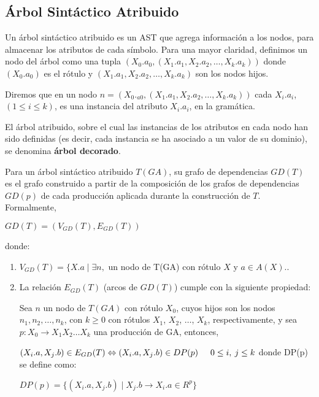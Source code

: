 \subsection{Árbol Sintáctico Atribuido}

Un árbol sintáctico atribuido es un AST que agrega información a los nodos, para almacenar los atributos de cada símbolo.
Para una mayor claridad, definimos un nodo del árbol como una tupla $(X_{0}.a_{0}, (X_{1}.a_{1}, X_{2}.a_{2}, \ldots , X_{k}.a_{k}))$ donde $(X_{0}.a_{0})$ es el rótulo y $(X_{1}.a_{1}, X_{2}.a_{2}, \ldots , X_{k}.a_{k})$ son los nodos hijos.

Diremos que en un nodo $n = (X_{0}._{a0}, (X_{1}.a_{1}, X_{2}.a_{2}, \ldots, X_{k}.a_{k}))$ cada $X_{i}.a_{i}$, $(1 \leq i \leq k)$, es una instancia del atributo $X_{i}.a_{i}$, en la gramática.

\begin{definition} 
\label{def:ast-attr}
El árbol atribuido, sobre el cual las instancias de los atributos en cada nodo han sido definidas (es decir, cada instancia se ha asociado a un valor de su dominio), se
denomina \textbf{árbol decorado}.
\end{definition}

\begin{definition} Para un árbol sintáctico atribuido $T(GA)$, su grafo de dependencias $GD(T)$ es el grafo construido a partir de la composición de los grafos de dependencias $GD(p)$ de cada producción aplicada durante la construcción de $T$. Formalmente,

$GD(T)=(V_{GD}(T),E_{GD}(T))$

donde:

\begin{enumerate}
\item $ V_{GD}(T) = \{ X.a \mid \exists n, $ un nodo de T(GA) con 
      rótulo $ X $ y $a \in A(X)$..
      
\item La relación $ E_{GD}(T) $ (arcos de $ GD(T) $) cumple con la siguiente 
      propiedad:

      Sea $n$ un nodo de $T(GA)$ con rótulo $X_0$, cuyos hijos son los nodos
      $ n_1, n_2, \ldots ,n_k $, con $ k \geq 0 $ con rótulos 
      $ X_1 $, $ X_2 $, $\ldots$, $ X_k $, respectivamente, y sea 
      $p:X_0 \rightarrow X_1 X_2 \ldots X_k$ una producción de GA, entonces,
      
      $ (X_{i}.a,X_{j}.b) \in E_{GD}(T) \Leftrightarrow 
         (X_{i}.a,X_{j}.b) \in DP(p) \hspace{0.5cm} 0 \leq i, \: j \leq k $
donde DP(p) se define como:

$DP(p) = \{(X_{i}.a,X_{j}.b) \mid X_{j}.b \rightarrow X_{i}.a \in R^{p}\}$

\end{enumerate}
\end{definition}

